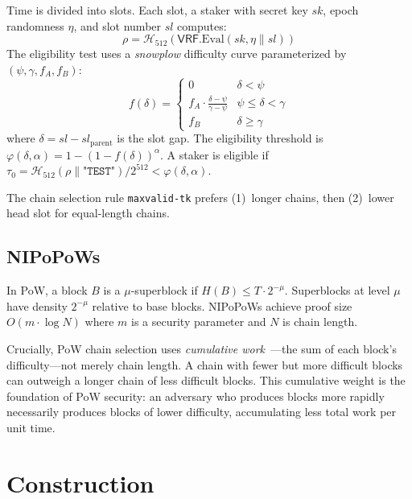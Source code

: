 \documentclass[11pt]{article}
\newcommand{\vrf}{\textsf{VRF}}
\newcommand{\hash}{\mathcal{H}}
\newcommand{\stake}{\alpha}
\newcommand{\threshold}{\varphi}
\begin{document}
Time is divided into slots. Each slot, a staker with secret key $sk$, epoch randomness $\eta$, and slot number $sl$ computes:
\begin{equation}
    \rho = \hash_{512}(\vrf.\text{Eval}(sk, \eta \| sl))
\end{equation}
The eligibility test uses a \emph{snowplow} difficulty curve parameterized by $(\psi, \gamma, f_A, f_B)$:
\begin{equation}
    f(\delta) = \begin{cases}
        0 & \delta < \psi \\
        f_A \cdot \frac{\delta - \psi}{\gamma - \psi} & \psi \leq \delta < \gamma \\
        f_B & \delta \geq \gamma
    \end{cases}
    \label{eq:snowplow}
\end{equation}
where $\delta = sl - sl_{\text{parent}}$ is the slot gap. The eligibility threshold is $\threshold(\delta, \stake) = 1 - (1 - f(\delta))^{\stake}$. A staker is eligible if $\tau_0 = \hash_{512}(\rho \| \texttt{"TEST"}) / 2^{512} < \threshold(\delta, \stake)$.

The chain selection rule \texttt{maxvalid-tk} prefers (1)~longer chains, then (2)~lower head slot for equal-length chains.

\subsection{NIPoPoWs}

In PoW, a block $B$ is a $\mu$-superblock if $H(B) \leq T \cdot 2^{-\mu}$. Superblocks at level $\mu$ have density $2^{-\mu}$ relative to base blocks. NIPoPoWs achieve proof size $O(m \cdot \log N)$ where $m$ is a security parameter and $N$ is chain length.

Crucially, PoW chain selection uses \emph{cumulative work}~\cite{backbone}---the sum of each block's difficulty---not merely chain length. A chain with fewer but more difficult blocks can outweigh a longer chain of less difficult blocks. This cumulative weight is the foundation of PoW security: an adversary who produces blocks more rapidly necessarily produces blocks of lower difficulty, accumulating less total work per unit time.

\section{Construction}
\end{document}
